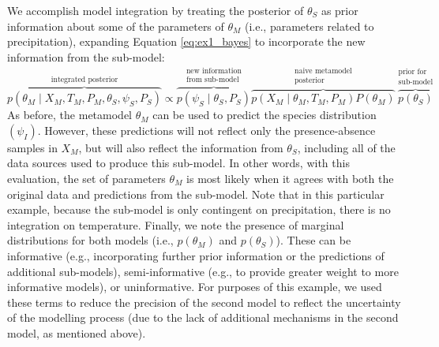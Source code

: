 We accomplish model integration by treating the posterior of \(\theta_S\) as prior information about some of the parameters of \(\theta_M\) (i.e., parameters related to precipitation), expanding Equation \ref{eq:ex1_bayes} to incorporate the new information from the sub-model:
\begin{equation}
	\label{eq:ex1_integrated}
	\overbrace{p(\theta_M \mid X_M, T_M, P_M, \theta_S, \psi_S, P_S)}^\text{integrated posterior}
	\propto
	\overbrace{p\left (\psi_S \mid \theta_S,P_S \right )}^{\substack{\text{new information} \\ \text{from sub-model}}}
	\overbrace{p \left(X_M \mid \theta_M, T_M, P_M \right) P \left(\theta_M \right)}^{\substack{\text{naive metamodel} \\ \text{posterior}}}
	\overbrace{p \left(\theta_S \right)}^{\substack{\text{prior for} \\ \text{sub-model}}}	
\end{equation}
As before, the metamodel \(\theta_M\) can be used to predict the species distribution \((\psi_I)\).
However, these predictions will not reflect only the presence-absence samples in \(X_M\), but will also reflect the information from \(\theta_S\), including all of the data sources used to produce this sub-model.
In other words, with this evaluation, the set of parameters $\theta_M$ is most likely when it agrees with both the original data and predictions from the sub-model. 
Note that in this particular example, because the sub-model is only contingent on precipitation, there is no integration on temperature. 
Finally, we note the presence of marginal distributions for both models (i.e., \(p(\theta_M)\) and \(p(\theta_S)\)).
These can be informative (e.g., incorporating further prior information or the predictions of additional sub-models), semi-informative (e.g., to provide greater weight to more informative models), or uninformative.
For purposes of this example, we used these terms to reduce the precision of the second model to reflect the uncertainty of the modelling process (due to the lack of additional mechanisms in the second model, as mentioned above).

